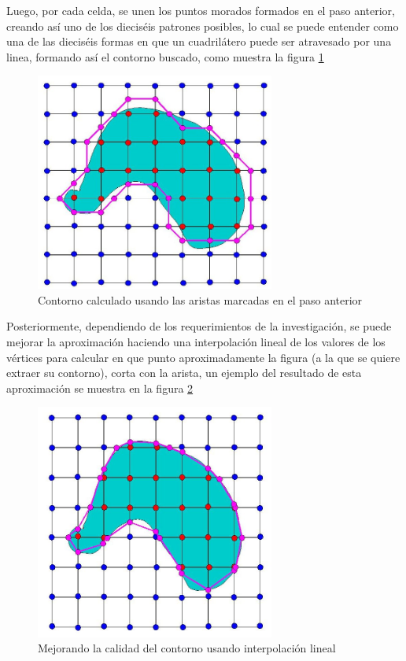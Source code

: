 Luego, por cada celda, se unen los puntos morados formados en el paso anterior, creando
así uno de los dieciséis patrones posibles, lo cual se puede entender como una de las dieciséis
formas en que un cuadrilátero puede ser atravesado por una linea, formando así el contorno
buscado, como muestra la figura \ref{f:estadoDelArte:connectedobj}

\begin{figure}
\centering
	\includegraphics[width=0.7\textwidth]{images/marchingsquare/connectedobj.jpg}
\caption{Contorno calculado usando las aristas marcadas en el paso anterior}
\label{f:estadoDelArte:connectedobj}
\end{figure}

Posteriormente, dependiendo de los requerimientos de la investigación, se puede mejorar
la aproximación haciendo una interpolación lineal de los valores de los vértices para calcular en
que punto aproximadamente la figura (a la que se quiere extraer su contorno), corta con la arista,
un ejemplo del resultado de esta aproximación se muestra en la figura \ref{f:estadoDelArte:2Dintersected}

\begin{figure}
\centering
	\includegraphics[width=0.7\textwidth]{images/marchingsquare/2Dintersected.jpg}
\caption{Mejorando la calidad del contorno usando interpolación lineal}
\label{f:estadoDelArte:2Dintersected}
\end{figure}

